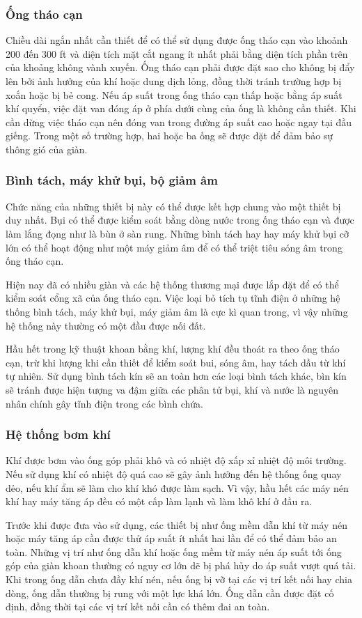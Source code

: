 \documentclass[13pt,a4paper]{article}
\begin{document}
\subsubsection{Ống tháo cạn}
	Chiều dài ngắn nhất cần thiết để có thể sử dụng được ống tháo cạn vào khoảnh 200 đến 300 ft và diện tích mặt cắt ngang ít nhất phải bằng diện tích phần trên của khoảng không vành xuyến. Ống tháo cạn phải được đặt sao cho không bị đẩy lên bởi ảnh hưởng của khí hoặc dung dịch lỏng, đồng thời tránh trường hợp bị xoắn hoặc bị bẻ cong. Nếu áp suất trong ống tháo cạn thấp hoặc bằng áp suất khí quyển, việc đặt van đóng áp ở phía dưới cùng của ống là không cần thiết. Khi cần dừng việc tháo cạn nên đóng van trong đường áp suất cao hoặc ngay tại đầu giếng. Trong một số trường hợp, hai hoặc ba ống sẽ được đặt để đảm bảo sự thông gió của giàn.
\subsubsection{Bình tách, máy khử bụi, bộ giảm âm}
	Chức năng của những thiết bị này có thể được kết hợp chung vào một thiết bị duy nhất. Bụi có thể được kiểm soát bằng dòng nước trong ống tháo cạn và được làm lắng đọng như là bùn ở sàn rung. Những bình tách hay hay máy khử bụi cỡ lớn có thể hoạt động như một máy giảm âm để có thể triệt tiêu sóng âm trong ống tháo cạn.\par
	Hiện nay đã có nhiều giàn và các hệ thống thương mại được lắp đặt để có thể kiểm soát cổng xã của ống tháo cạn. Việc loại bỏ tích tụ tĩnh điện ở những hệ thống bình tách, máy khử bụi, máy giảm âm là cực kì quan trong, vì vậy những hệ thống này thường có một đầu được nối đất.\par
	Hầu hết trong kỹ thuật khoan bằng khí, lượng khí đều thoát ra theo ống tháo cạn, trừ khi lượng khi cần thiết để kiểm soát bui, sóng âm, hay tách dầu từ khí tự nhiên. Sử dụng bình tách kín sẽ an toàn hơn các loại bình tách khác, bìn kín sẽ tránh được hiện tượng va đậm giữa các phân tử bụi, khí và nước là nguyên nhân chính gây tĩnh điện trong các bình chứa.
\subsubsection{Hệ thống bơm khí}
	Khí được bơm vào ống góp phải khô và có nhiệt độ xấp xỉ nhiệt độ môi trường. Nếu sử dụng khí có nhiệt độ quá cao sẽ gây ảnh hưởng đến hệ thống ống quay dẻo, nếu khí ẩm sẽ làm cho khí khó được làm sạch. Vì vậy, hầu hết các máy nén khí hay máy tăng áp đều có một cấp làm lạnh và làm khô khí ở đầu ra.\par
	Trước khi được đưa vào sử dụng, các thiết bị như ống mềm dẫn khí từ máy nén hoặc máy tăng áp cần được thử áp suất ít nhất hai lần để có thể đảm bảo an toàn. Những vị trí như ống dẫn khí hoặc ống mềm từ máy nén áp suất tới ống góp của giàn khoan thường có nguy cơ lớn dẽ bị phá hủy do áp suất vượt quá tải. Khi trong ống dẫn chưa đầy khí nén, nếu ống bị vỡ tại các vị trí kết nối hay chia dòng, ống dẫn thường bị rung với một lực khá lớn. Ống dẫn cần được đặt cố định, đồng thời tại các vị trí kết nối cần có thêm đai an toàn.
\end{document}
